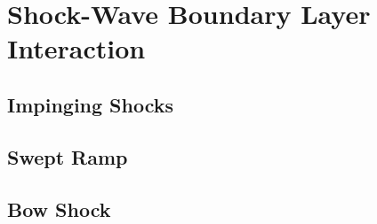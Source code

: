 \section{Shock-Wave Boundary Layer Interaction}



\subsection{Impinging Shocks}



\subsection{Swept Ramp}



\subsection{Bow Shock}


